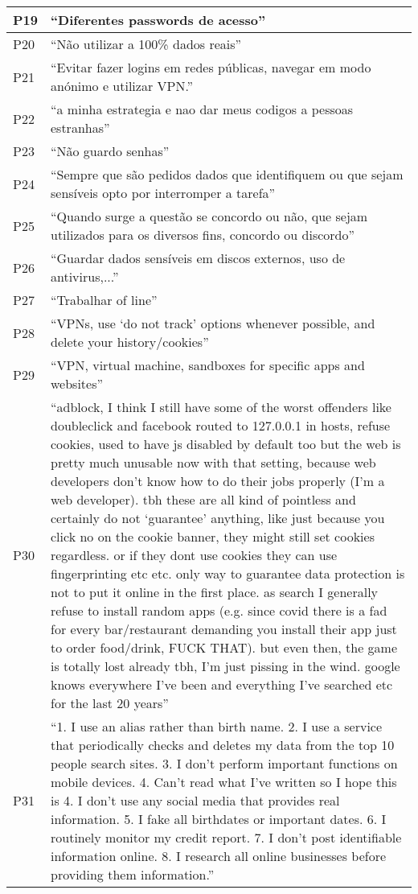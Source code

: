 \begin{longtable}{p{3cm} p{13cm}}
    \hline
    P19 & ``Diferentes passwords de acesso'' \\
    \hline
    P20 & ``Não utilizar a 100\% dados reais'' \\
    \hline
    P21 & ``Evitar fazer logins em redes públicas, navegar em modo anónimo e utilizar VPN.'' \\
    \hline
    P22 & ``a minha estrategia e nao dar meus codigos a pessoas estranhas'' \\
    \hline
    P23 & ``Não guardo senhas'' \\
    \hline
    P24 & ``Sempre que são pedidos dados que identifiquem ou que sejam sensíveis opto por interromper a tarefa'' \\
    \hline
    P25 & ``Quando surge a questão se concordo ou não, que sejam utilizados para os diversos fins, concordo ou discordo'' \\
    \hline
    P26 & ``Guardar dados sensíveis em discos externos, uso de antivirus,...'' \\
    \hline
    P27 & ``Trabalhar of line'' \\
    \hline
    P28 & ``VPNs, use `do not track' options whenever possible, and delete your history/cookies'' \\
    \hline
    P29 & ``VPN, virtual machine, sandboxes for specific apps and websites'' \\
    \hline
    P30 & ``adblock, I think I still have some of the worst offenders like doubleclick and facebook routed to 127.0.0.1 in hosts, refuse cookies, used to have js disabled by default too but the web is pretty much unusable now with that setting, because web developers don't know how to do their jobs properly (I'm a web developer).  tbh these are all kind of pointless and certainly do not `guarantee' anything, like just because you click no on the cookie banner, they might still set cookies regardless.  or if they dont use cookies they can use fingerprinting etc etc.  only way to guarantee data protection is not to put it online in the first place.  as search I generally refuse to install random apps (e.g. since covid there is a fad for every bar/restaurant demanding you install their app just to order food/drink, FUCK THAT).  but even then, the game is totally lost already tbh, I'm just pissing in the wind.  google knows everywhere I've been and everything I've searched etc for the last 20 years'' \\
    \hline
    P31 & ``1. I use an alias rather than birth name. 2. I use a service that periodically checks and deletes my data from the top 10 people search sites. 3. I don't perform important functions on mobile devices. 4. Can't read what I've written so I hope this is 4. I don't use any social media that provides real information. 5. I fake all birthdates or important dates. 6. I routinely monitor my credit report. 7. I don't post identifiable information online. 8. I research all online businesses before providing them information.'' \\

\end{longtable}
